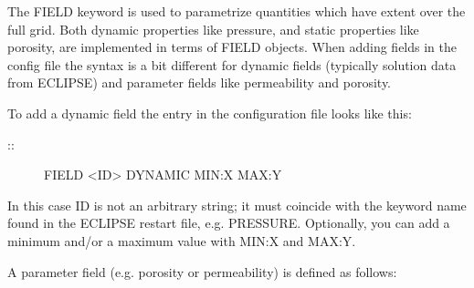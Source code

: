 \documentclass[a4paper,10pt,english]{sphinxmanual}
\begin{document}
\label{\detokenize{keywords/index:field}}
\begin{sphinxShadowBox}

The FIELD keyword is used to parametrize quantities which have extent over the
full grid. Both dynamic properties like pressure, and static properties like
porosity, are implemented in terms of FIELD objects. When adding fields in the
config file the syntax is a bit different for dynamic fields (typically
solution data from ECLIPSE) and parameter fields like permeability and
porosity.


To add a dynamic field the entry in the configuration file looks like this:
\begin{description}
\item[{::}] \leavevmode
FIELD   \textless{}ID\textgreater{}   DYNAMIC  MIN:X  MAX:Y

\end{description}

In this case ID is not an arbitrary string; it must coincide with the keyword
name found in the ECLIPSE restart file, e.g. PRESSURE. Optionally, you can add
a minimum and/or a maximum value with MIN:X and MAX:Y.


%
\begin{sphinxVerbatim}[commandchars=\\\{\}]
    
  
\end{sphinxVerbatim}


%
\begin{sphinxVerbatim}[commandchars=\\\{\}]
      
    
\end{sphinxVerbatim}


A parameter field (e.g. porosity or permeability) is defined as follows:


\end{sphinxShadowBox}
\end{document}
